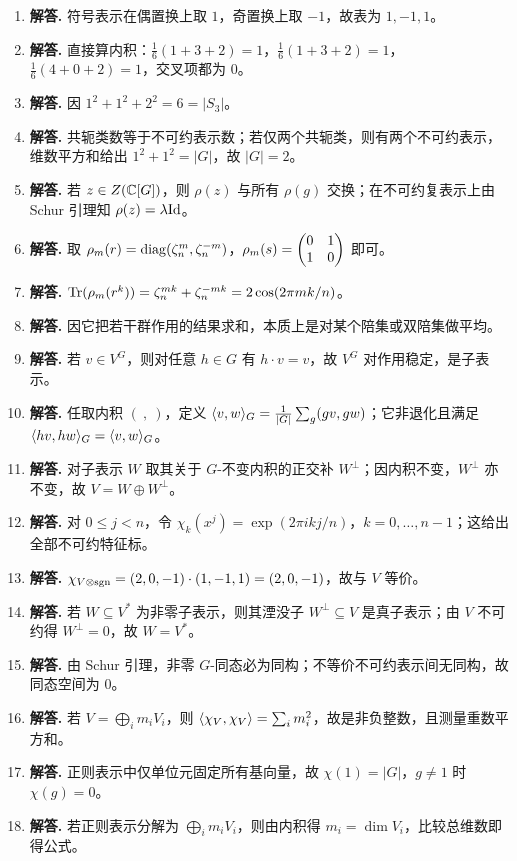 \begin{enumerate}[label=\textbf{\arabic*.}, leftmargin=*, itemsep=1em]
\item \textbf{解答.} 符号表示在偶置换上取 $1$，奇置换上取 $-1$，故表为 $1,-1,1$。
\item \textbf{解答.} 直接算内积：$\frac16(1+3+2)=1$，$\frac16(1+3+2)=1$，$\frac16(4+0+2)=1$，交叉项都为 $0$。
\item \textbf{解答.} 因 $1^2+1^2+2^2=6=|S_3|$。
\item \textbf{解答.} 共轭类数等于不可约表示数；若仅两个共轭类，则有两个不可约表示，维数平方和给出 $1^2+1^2=|G|$，故 $|G|=2$。
\item \textbf{解答.} 若 $z\in Z(\mathbb{C}[G])$，则 $\rho(z)$ 与所有 $\rho(g)$ 交换；在不可约复表示上由 Schur 引理知 $\rho(z)=\lambda\mathrm{Id}$。
\item \textbf{解答.} 取 $\rho_m(r)=\mathrm{diag}(\zeta_n^m,\zeta_n^{-m})$，$\rho_m(s)=\begin{pmatrix} 0&1\\1&0 \end{pmatrix}$ 即可。
\item \textbf{解答.} $\mathrm{Tr}(\rho_m(r^k))=\zeta_n^{mk}+\zeta_n^{-mk}=2\cos(2\pi mk/n)$。
\item \textbf{解答.} 因它把若干群作用的结果求和，本质上是对某个陪集或双陪集做平均。
\item \textbf{解答.} 若 $v\in V^G$，则对任意 $h\in G$ 有 $h\cdot v=v$，故 $V^G$ 对作用稳定，是子表示。
\item \textbf{解答.} 任取内积 $(\ ,\ )$，定义 $\langle v, w \rangle_G=\frac1{|G|}\sum_g (gv,gw)$；它非退化且满足 $\langle hv, hw \rangle_G=\langle v, w \rangle_G$。
\item \textbf{解答.} 对子表示 $W$ 取其关于 $G$-不变内积的正交补 $W^\perp$；因内积不变，$W^\perp$ 亦不变，故 $V=W\oplus W^\perp$。
\item \textbf{解答.} 对 $0\le j<n$，令 $\chi_k(x^j)=\exp(2\pi i kj/n)$，$k=0,\dots,n-1$；这给出全部不可约特征标。
\item \textbf{解答.} $\chi_{V\otimes \operatorname{sgn}}=(2,0,-1)\cdot(1,-1,1)=(2,0,-1)$，故与 $V$ 等价。
\item \textbf{解答.} 若 $W\subseteq V^*$ 为非零子表示，则其湮没子 $W^\perp\subseteq V$ 是真子表示；由 $V$ 不可约得 $W^\perp=0$，故 $W=V^*$。
\item \textbf{解答.} 由 Schur 引理，非零 $G$-同态必为同构；不等价不可约表示间无同构，故同态空间为 $0$。
\item \textbf{解答.} 若 $V=\bigoplus_i m_iV_i$，则 $\langle \chi_V, \chi_V \rangle=\sum_i m_i^2$，故是非负整数，且测量重数平方和。
\item \textbf{解答.} 正则表示中仅单位元固定所有基向量，故 $\chi(1)=|G|$，$g\neq 1$ 时 $\chi(g)=0$。
\item \textbf{解答.} 若正则表示分解为 $\bigoplus_i m_iV_i$，则由内积得 $m_i=\dim V_i$，比较总维数即得公式。

\end{enumerate}
